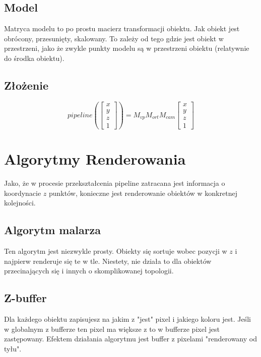 \documentclass{../notatki}
\begin{document}
\subsection{Model}

Matryca modelu to po prostu macierz transformacji obiektu.
Jak obiekt jest obrócony, przesunięty, skalowany.
To zależy od tego gdzie jest obiekt w przestrzeni, jako że zwykle
punkty modelu są w przestrzeni obiektu (relatywnie do środka obiektu).

\subsection{Złożenie}

$$
pipeline(
  \begin{bmatrix}x \\ y \\ z\\ 1
\end{bmatrix}) = M_{vp}M_{ort}M_{cam}
\begin{bmatrix}x \\ y \\ z\\ 1
\end{bmatrix}
$$

\section{Algorytmy Renderowania}

Jako, że w procesie przekształcenia pipeline zatracana jest
informacja o koordynacie $z$ punktów, konieczne jest renderowanie
obiektów w konkretnej kolejności.

\subsection{Algorytm malarza}

Ten algorytm jest niezwykle prosty.
Obiekty się sortuje wobec pozycji w $z$ i najpierw renderuje się te w tle.
Niestety, nie działa to dla obiektów przecinających się i innych o
skomplikowanej topologii.

\subsection{Z-buffer}

Dla każdego obiektu zapisujesz na jakim z "jest" pixel i jakiego koloru jest.
Jeśli w globalnym z bufferze ten pixel ma większe z to w bufferze
pixel jest zastępowany.
Efektem działania algorytmu jest buffer z pixelami "renderowany od tyłu".
\end{document}
